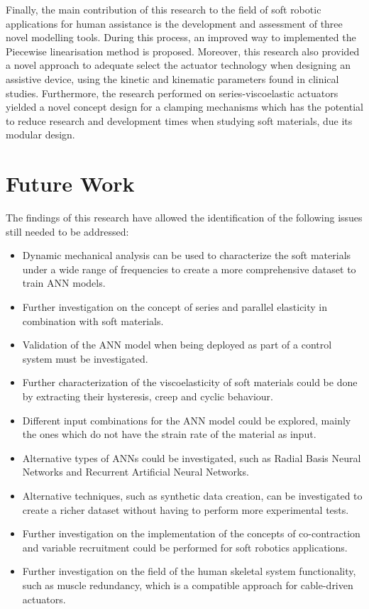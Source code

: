 Finally, the main contribution of this research to the field of soft robotic applications for human assistance is the development and assessment of three novel modelling tools. During this process, an improved way to implemented the Piecewise linearisation method is proposed. Moreover, this research also provided a novel approach to adequate select the actuator technology when designing an assistive device, using the kinetic and kinematic parameters found in clinical studies. Furthermore, the research performed on series-viscoelastic actuators yielded a novel concept design for a clamping mechanisms which has the potential to reduce research and development times when studying soft materials, due its modular design.

\section{Future Work}

The findings of this research have allowed the identification of the following issues still needed to be addressed:

\begin{itemize}
    \item Dynamic mechanical analysis can be used to characterize the soft materials under a wide range of frequencies to create a more comprehensive dataset to train ANN models.
    \item Further investigation on the concept of series and parallel elasticity in combination with soft materials.
    \item Validation of the ANN model when being deployed as part of a control system must be investigated.
    \item Further characterization of the viscoelasticity of soft materials could be done by extracting their hysteresis, creep and cyclic behaviour.
    \item Different input combinations for the ANN model could be explored, mainly the ones which do not have the strain rate of the material as input.
    \item Alternative types of ANNs could be investigated, such as Radial Basis Neural Networks and Recurrent Artificial Neural Networks.
    \item Alternative techniques, such as synthetic data creation, can be investigated to create a richer dataset without having to perform more experimental tests.
    \item Further investigation on the implementation of the concepts of co-contraction and variable recruitment could be performed for soft robotics applications.
    \item Further investigation on the field of the human skeletal system functionality, such as muscle redundancy, which is a compatible approach for cable-driven actuators.
\end{itemize}